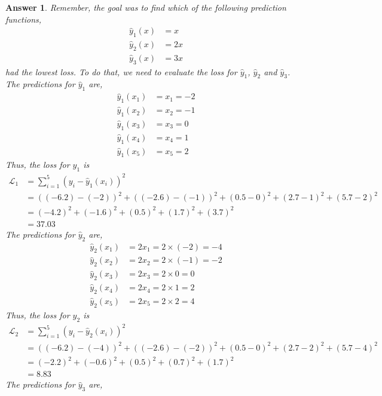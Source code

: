 \documentclass{article}
\newtheorem{answer}{Answer}
\renewcommand{\L}{\mathcal{L}}
\begin{document}
\begin{answer}
  Remember, the goal was to find which of the following prediction functions,
  \begin{align}
    \hat{y}_1(x) &= x\\
    \hat{y}_2(x) &= 2 x\\
    \hat{y}_3(x) &= 3 x
  \end{align}
  had the lowest loss.
  To do that, we need to evaluate the loss for $\hat{y}_1$, $\hat{y}_2$ and $\hat{y}_3$.  
  The predictions for $\hat{y}_1$ are,
  \begin{align}
    \hat{y}_1(x_1) &= x_1 = -2\\
    \hat{y}_1(x_2) &= x_2 = -1\\
    \hat{y}_1(x_3) &= x_3 = 0\\
    \hat{y}_1(x_4) &= x_4 = 1\\
    \hat{y}_1(x_5) &= x_5 = 2
  \end{align}
  Thus, the loss for $\hat{y}_1$ is  
  \begin{align}
    \L_1 &= \sum_{i=1}^5 (y_i - \hat{y}_1(x_i))^2\\
    \nonumber
    &= ((-6.2) - (-2))^2 + ((-2.6) - (-1))^2 + (0.5 - 0)^2 + (2.7 - 1)^2 + (5.7 - 2)^2\\
    &= (-4.2)^2 + (-1.6)^2 + (0.5)^2 + (1.7)^2 + (3.7)^2\\
    &= 37.03
  \end{align}
  The predictions for $\hat{y}_2$ are,
  \begin{align}
    \hat{y}_2(x_1) &= 2x_1 = 2\times(-2) = -4 \\
    \hat{y}_2(x_2) &= 2x_2 = 2\times(-1) = -2\\
    \hat{y}_2(x_3) &= 2x_3 = 2\times0 = 0\\
    \hat{y}_2(x_4) &= 2x_4 = 2\times1 = 2\\
    \hat{y}_2(x_5) &= 2x_5 = 2\times2 = 4
  \end{align}
  Thus, the loss for $\hat{y}_2$ is  
  \begin{align}
    \L_2 &= \sum_{i=1}^5 (y_i - \hat{y}_2(x_i))^2\\
    \nonumber
    &= ((-6.2) - (-4))^2 + ((-2.6) - (-2))^2 + (0.5 - 0)^2 + (2.7 - 2)^2 + (5.7 - 4)^2\\
    &= (-2.2)^2 + (-0.6)^2 + (0.5)^2 + (0.7)^2 + (1.7)^2\\
    &= 8.83
  \end{align}
  The predictions for $\hat{y}_3$ are,
  \begin{align}

\end{align}
\end{answer}
\end{document}
